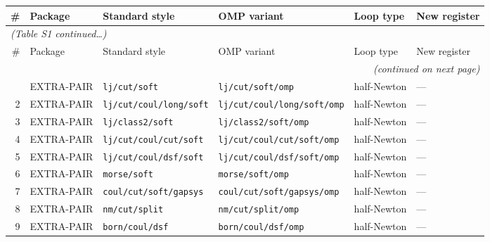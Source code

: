 \documentclass[
  11pt,
]{article}
\begin{document}
\begin{landscape}
\begingroup
\small
\setlength{\tabcolsep}{5pt}
\renewcommand{\arraystretch}{1.18}
\begin{longtable}{r l p{4.8cm} p{5.4cm} l p{3.2cm}}
\toprule
\# & Package & Standard style & OMP variant & Loop type & New register \\
\midrule
\endfirsthead
\multicolumn{6}{l}{\small\itshape (Table S1 continued\ldots)}\\[2pt]
\toprule
\# & Package & Standard style & OMP variant & Loop type & New register \\
\midrule
\endhead
\midrule
\multicolumn{6}{r}{\small\itshape (continued on next page)}\\
\endfoot
\bottomrule
\endlastfoot
 1 & EXTRA-PAIR & \nolinkurl{lj/cut/soft}                  & \nolinkurl{lj/cut/soft/omp}                  & half-Newton      & ---                  \\
 2 & EXTRA-PAIR & \nolinkurl{lj/cut/coul/long/soft}         & \nolinkurl{lj/cut/coul/long/soft/omp}         & half-Newton      & ---                  \\
 3 & EXTRA-PAIR & \nolinkurl{lj/class2/soft}                & \nolinkurl{lj/class2/soft/omp}                & half-Newton      & ---                  \\
 4 & EXTRA-PAIR & \nolinkurl{lj/cut/coul/cut/soft}          & \nolinkurl{lj/cut/coul/cut/soft/omp}          & half-Newton      & ---                  \\
 5 & EXTRA-PAIR & \nolinkurl{lj/cut/coul/dsf/soft}          & \nolinkurl{lj/cut/coul/dsf/soft/omp}          & half-Newton      & ---                  \\
 6 & EXTRA-PAIR & \nolinkurl{morse/soft}                    & \nolinkurl{morse/soft/omp}                    & half-Newton      & ---                  \\
 7 & EXTRA-PAIR & \nolinkurl{coul/cut/soft/gapsys}          & \nolinkurl{coul/cut/soft/gapsys/omp}          & half-Newton      & ---                  \\
 8 & EXTRA-PAIR & \nolinkurl{nm/cut/split}                  & \nolinkurl{nm/cut/split/omp}                  & half-Newton      & ---                  \\
 9 & EXTRA-PAIR & \nolinkurl{born/coul/dsf}                 & \nolinkurl{born/coul/dsf/omp}                 & half-Newton      & ---                  \\

\end{longtable}
\end{landscape}
\end{document}
